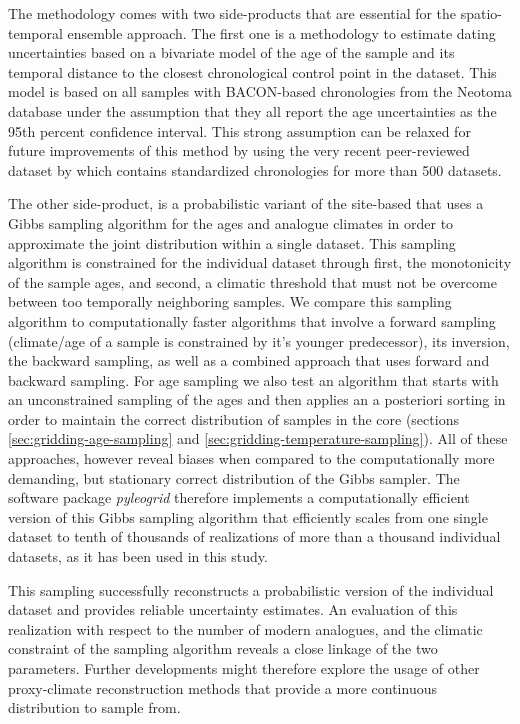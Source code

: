 \begin{refsection}
The methodology comes with two side-products that are essential for the spatio-temporal ensemble approach. The first one is a methodology to estimate dating uncertainties based on a bivariate model of the age of the sample and its temporal distance to the closest chronological control point in the dataset. This model is based on all samples with BACON-based chronologies from the Neotoma database under the assumption that they all report the age uncertainties as the 95th percent confidence interval. This strong assumption can be relaxed for future improvements of this method by using the very recent peer-reviewed dataset by \cite{WangGoringMcGuire2019} which contains standardized chronologies for more than 500 datasets.

The other side-product, is a probabilistic variant of the site-based  that uses a Gibbs sampling algorithm for the ages and analogue climates in order to approximate the joint distribution within a single dataset. This sampling algorithm is constrained for the individual dataset through first, the monotonicity of the sample ages, and second, a climatic threshold that must not be overcome between too temporally neighboring samples. We compare this sampling algorithm to computationally faster algorithms that involve a forward sampling (climate/age of a sample is constrained by it's younger predecessor), its inversion, the backward sampling, as well as a combined approach that uses forward and backward sampling. For age sampling we also test an algorithm that starts with an unconstrained sampling of the ages and then applies an a posteriori sorting in order to maintain the correct distribution of samples in the core (sections \ref{sec:gridding-age-sampling} and \ref{sec:gridding-temperature-sampling}). All of these approaches, however reveal biases when compared to the computationally more demanding, but stationary correct distribution of the Gibbs sampler. The software package \textit{pyleogrid} therefore implements a computationally efficient version of this Gibbs sampling algorithm that efficiently scales from one single dataset to tenth of thousands of realizations of more than a thousand individual datasets, as it has been used in this study.

This sampling successfully reconstructs a probabilistic version of the individual dataset and provides reliable uncertainty estimates. An evaluation of this realization with respect to the number of modern analogues, and the climatic constraint of the sampling algorithm reveals a close linkage of the two parameters. Further developments might therefore explore the usage of other proxy-climate reconstruction methods that provide a more continuous distribution to sample from. 


\end{refsection}
